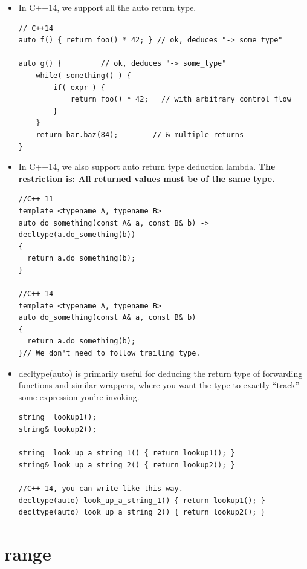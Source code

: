 \documentclass[a4paper,11pt,twoside]{book}
\begin{document}
\begin{itemize}
		\item In C++14, we support all the auto return type. 

\begin{lstlisting}
// C++14
auto f() { return foo() * 42; } // ok, deduces "-> some_type"

auto g() {         // ok, deduces "-> some_type"
    while( something() ) {
        if( expr ) {
            return foo() * 42;   // with arbitrary control flow
        }
    }
    return bar.baz(84);        // & multiple returns
}              
\end{lstlisting}

		\item In C++14, we also support auto return type deduction lambda. \textbf{The restriction is: All returned values must be of the same type.}

\begin{lstlisting}
//C++ 11
template <typename A, typename B>
auto do_something(const A& a, const B& b) -> decltype(a.do_something(b))
{
  return a.do_something(b);
}

//C++ 14
template <typename A, typename B>
auto do_something(const A& a, const B& b)
{
  return a.do_something(b);
}// We don't need to follow trailing type.
\end{lstlisting}

		\item decltype(auto) is primarily useful for deducing the return type of forwarding functions and similar wrappers, where you want the type to exactly “track” some expression you’re invoking.
\begin{lstlisting}
string  lookup1();
string& lookup2();

string  look_up_a_string_1() { return lookup1(); }
string& look_up_a_string_2() { return lookup2(); }

//C++ 14, you can write like this way.
decltype(auto) look_up_a_string_1() { return lookup1(); }
decltype(auto) look_up_a_string_2() { return lookup2(); }
\end{lstlisting}

\end{itemize}

\section{range}
\end{document}
